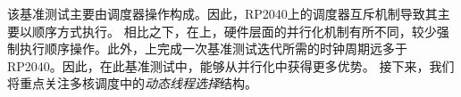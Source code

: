 \iffalse
\begin{enumerate}
    \item The \textit{Dynamic} approach outperforms the \textit{Reallocation} on both platforms.
    \item On the RP2040, no significant speedup was achieved through the multicore configuration, and even a degradation in case of the \textit{Dynamic} approach. On the \espsthree{}, the speedup is a factor of 1.3 in the \textit{Reallocation} approach and 1.5 for the \textit{Dynamic} one.
\end{enumerate}
\fi
该基准测试主要由调度器操作构成。因此，RP2040上的调度器互斥机制导致其主要以顺序方式执行。
相比之下，在\espsthree{}上，硬件层面的并行化机制有所不同，较少强制执行顺序操作。此外，\espsthree{}上完成一次基准测试迭代所需的时钟周期远多于RP2040。因此，在此基准测试中，\espsthree{}能够从并行化中获得更多优势。
接下来，我们将重点关注多核调度中的\textit{动态线程选择}结构。

